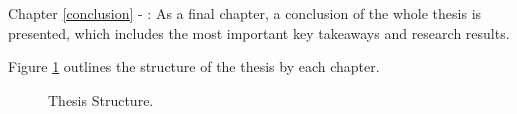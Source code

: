 Chapter \ref{conclusion} - :
As a final chapter, a conclusion of the whole thesis is presented,
which includes the most important key takeaways and research results.

Figure \ref{fig:thesis-structure-simple-overview} outlines the structure of the thesis
by each chapter.

\begin{figure}[h]
	\centering
	\caption{Thesis Structure.
	}
	\label{fig:thesis-structure-simple-overview}	
\end{figure}





















%


